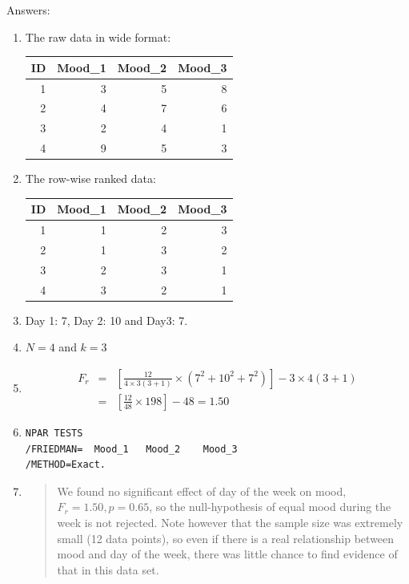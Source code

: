 \documentclass[]{report}\usepackage[]{graphicx}\usepackage[]{color}
\newenvironment{knitrout}{}{} %
\begin{document}
Answers:
\begin{enumerate}

\item
The raw data in wide format:
\begin{knitrout}
\color{fgcolor}
\begin{tabular}{r|r|r|r}
\hline
ID & Mood\_1 & Mood\_2 & Mood\_3\\
\hline
1 & 3 & 5 & 8\\
\hline
2 & 4 & 7 & 6\\
\hline
3 & 2 & 4 & 1\\
\hline
4 & 9 & 5 & 3\\
\hline
\end{tabular}


\end{knitrout}

\item
The row-wise ranked data:
\begin{knitrout}
\color{fgcolor}
\begin{tabular}{r|r|r|r}
\hline
ID & Mood\_1 & Mood\_2 & Mood\_3\\
\hline
1 & 1 & 2 & 3\\
\hline
2 & 1 & 3 & 2\\
\hline
3 & 2 & 3 & 1\\
\hline
4 & 3 & 2 & 1\\
\hline
\end{tabular}


\end{knitrout}
\item Day 1: 7, Day 2: 10 and Day3: 7.
\item $N=4$ and $k=3$
\item

\begin{eqnarray}
F_r &=& \left[  \frac{12}{4 \times  3(3+1)} \times (7^2 + 10^2 + 7^2)      \right] - 3 \times 4 (3+1) \nonumber \\
  &=&   \left[  \frac{12}{48} \times  198      \right] - 48 = 1.50  \nonumber
\end{eqnarray}

\item

\begin{verbatim}
NPAR TESTS
/FRIEDMAN=  Mood_1   Mood_2    Mood_3
/METHOD=Exact.
\end{verbatim}

\item
\begin{quotation}
We found no significant effect of day of the week on mood, $F_r=1.50, p=0.65$, so the null-hypothesis of equal mood during the week is not rejected. Note however that the sample size was extremely small (12 data points), so even if there is a real relationship between mood and day of the week, there was little chance to find evidence of that in this data set.
\end{quotation}


\end{enumerate}
\end{document}
